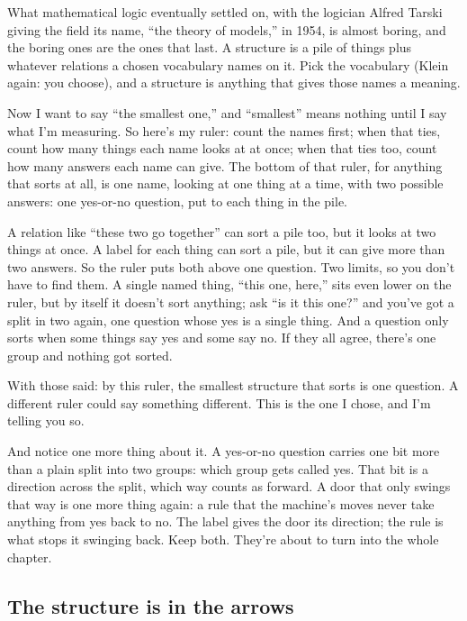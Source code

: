 \documentclass[11pt,twoside]{article}
\theoremstyle{thielethm}
\theoremstyle{thieledef}
\theoremstyle{thieledef}
\theoremstyle{thieledef}
\theoremstyle{thielethm}
\theoremstyle{thieleobs}
\theoremstyle{thielethm}
\begin{document}
What mathematical logic eventually settled on, with the logician Alfred Tarski giving the field its name, ``the theory of models,'' in 1954, is almost boring, and the boring ones are the ones that last. A structure is a pile of things plus whatever relations a chosen vocabulary names on it. Pick the vocabulary (Klein again: you choose), and a structure is anything that gives those names a meaning.

Now I want to say ``the smallest one,'' and ``smallest'' means nothing until I say what I'm measuring. So here's my ruler: count the names first; when that ties, count how many things each name looks at at once; when that ties too, count how many answers each name can give. The bottom of that ruler, for anything that sorts at all, is one name, looking at one thing at a time, with two possible answers: one yes-or-no question, put to each thing in the pile.

A relation like ``these two go together'' can sort a pile too, but it looks at two things at once. A label for each thing can sort a pile, but it can give more than two answers. So the ruler puts both above one question. Two limits, so you don't have to find them. A single named thing, ``this one, here,'' sits even lower on the ruler, but by itself it doesn't sort anything; ask ``is it this one?'' and you've got a split in two again, one question whose yes is a single thing. And a question only sorts when some things say yes and some say no. If they all agree, there's one group and nothing got sorted.

With those said: by this ruler, the smallest structure that sorts is one question. A different ruler could say something different. This is the one I chose, and I'm telling you so.

And notice one more thing about it. A yes-or-no question carries one bit more than a plain split into two groups: which group gets called yes. That bit is a direction across the split, which way counts as forward. A door that only swings that way is one more thing again: a rule that the machine's moves never take anything from yes back to no. The label gives the door its direction; the rule is what stops it swinging back. Keep both. They're about to turn into the whole chapter.

\subsection{The structure is in the arrows}
\end{document}
